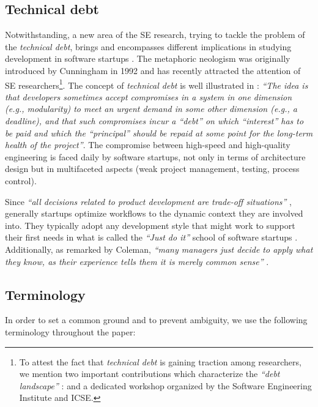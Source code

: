 \documentclass[10pt,journal,letterpaper,compsoc]{IEEEtran}
\begin{document}
\subsection{Technical debt}
Notwithstanding, a new area of the SE research, trying to tackle the problem of 
the \textit{technical debt},  brings and encompasses different implications in 
studying development in software startups \cite{Tom2013}. The metaphoric 
neologism was originally introduced by Cunningham in 1992 
\cite{TechnicalDebtCunn} and has recently attracted the attention of SE 
researchers\footnote{To attest the fact that \textit{technical debt} is gaining 
traction among researchers, we mention two important contributions which 
characterize the \textit{``debt landscape''} : \cite{Nugroho2011,Izurieta2012} 
and a dedicated workshop \cite{workshopDebt} organized by the Software 
Engineering Institute  and ICSE.}. The concept of \textit{technical debt} is 
well illustrated in \cite{Brown:2010:MTD:1882362.1882373} : \textit{``The idea 
is that developers sometimes accept compromises in a system in one dimension 
(e.g., modularity) to meet an urgent demand in some other dimension (e.g., a 
deadline), and that such compromises incur a ``debt'' on which ``interest'' has 
to be paid and which the ``principal'' should be repaid at some point for the 
long-term health of the project''}.  The compromise between high-speed and 
high-quality engineering is faced daily by software startups, not only in terms 
of architecture design but in multifaceted aspects (weak project management, 
testing, process control).

Since \textit{``all decisions related to product development are trade-off 
situations''} \cite{Hilmola2003}, generally startups optimize workflows to the 
dynamic context they are involved into. They typically adopt any development 
style that might work to support their first needs in what is called the 
\textit{``Just do it''} school of software startups \cite{Ries2011}. 
Additionally, as remarked by Coleman, \textit{``many managers just decide to 
apply what they know, as their experience tells them it is merely common 
sense''} \cite{Coleman2008}.

\subsection{Terminology}
In order to set a common ground and to prevent ambiguity, we use the following 
terminology throughout the paper:
\end{document}
